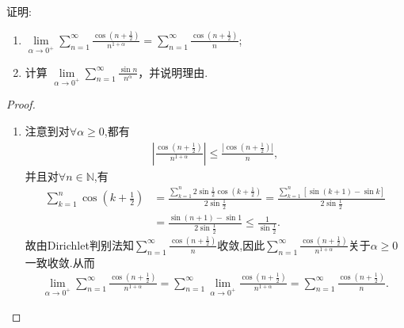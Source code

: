 \documentclass[../../main.tex]{subfiles}
\begin{document}
\begin{example}
证明: 
\begin{enumerate}[(1)]
\item $\lim\limits_{\alpha \to 0^+} \sum\limits_{n=1}^{\infty} \frac{\cos\left(n + \frac{1}{2}\right)}{n^{1+\alpha}} = \sum\limits_{n=1}^{\infty} \frac{\cos\left(n + \frac{1}{2}\right)}{n}$;

\item 计算 $\lim\limits_{\alpha \to 0^+} \sum\limits_{n=1}^{\infty} \frac{\sin n}{n^{\alpha}}$，并说明理由.
\end{enumerate}
\end{example}
\begin{proof}
\begin{enumerate}[(1)]
\item 注意到对$\forall \alpha \geqslant 0$,都有
\begin{align*}
\left| \frac{\cos \left( n+\frac{1}{2} \right)}{n^{1+\alpha}} \right| \leqslant \frac{|\cos \left( n+\frac{1}{2} \right)|}{n},
\end{align*}
并且对$\forall n\in \mathbb{N}$,有
\begin{align*}
\sum\limits_{k=1}^n \cos \left( k+\frac{1}{2} \right)&=\frac{\sum\limits_{k=1}^n 2\sin \frac{1}{2}\cos \left( k+\frac{1}{2} \right)}{2\sin \frac{1}{2}}=\frac{\sum\limits_{k=1}^n \left[ \sin \left( k+1 \right) -\sin k \right]}{2\sin \frac{1}{2}}\\
&=\frac{\sin \left( n+1 \right) -\sin 1}{2\sin \frac{1}{2}} \leqslant \frac{1}{\sin \frac{1}{2}}.
\end{align*}
故由Dirichlet判别法知$\sum\limits_{n=1}^{\infty} \frac{\cos \left( n+\frac{1}{2} \right)}{n}$收敛,因此$\sum\limits_{n=1}^{\infty} \frac{\cos \left( n+\frac{1}{2} \right)}{n^{1+\alpha}}$关于$\alpha \geqslant 0$一致收敛.从而
\begin{align*}
\lim_{\alpha \rightarrow 0^+} \sum\limits_{n=1}^{\infty} \frac{\cos \left( n+\frac{1}{2} \right)}{n^{1+\alpha}}=\sum\limits_{n=1}^{\infty} \lim_{\alpha \rightarrow 0^+} \frac{\cos \left( n+\frac{1}{2} \right)}{n^{1+\alpha}}=\sum\limits_{n=1}^{\infty} \frac{\cos \left( n+\frac{1}{2} \right)}{n}.
\end{align*}


\end{enumerate}
\end{proof}
\end{document}
